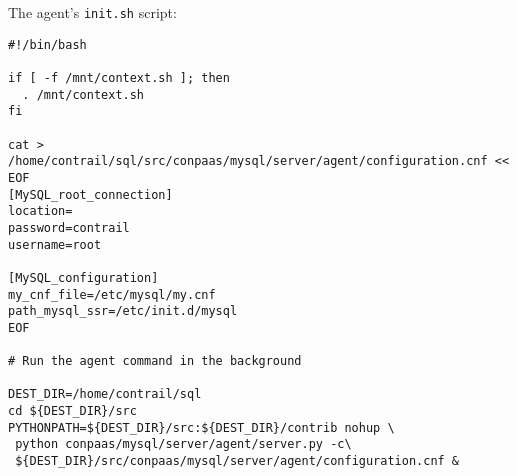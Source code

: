 \documentclass[a4paper,10pt]{article}
\begin{document}
\newpage
\vspace{4mm}

The agent's {\tt init.sh} script:

\begin{Verbatim}[frame=single]
#!/bin/bash
 
if [ -f /mnt/context.sh ]; then
  . /mnt/context.sh
fi
 
cat >  /home/contrail/sql/src/conpaas/mysql/server/agent/configuration.cnf << EOF
[MySQL_root_connection]
location=
password=contrail
username=root

[MySQL_configuration]
my_cnf_file=/etc/mysql/my.cnf
path_mysql_ssr=/etc/init.d/mysql
EOF

# Run the agent command in the background

DEST_DIR=/home/contrail/sql
cd ${DEST_DIR}/src
PYTHONPATH=${DEST_DIR}/src:${DEST_DIR}/contrib nohup \
 python conpaas/mysql/server/agent/server.py -c\
 ${DEST_DIR}/src/conpaas/mysql/server/agent/configuration.cnf &

\end{Verbatim}

\newpage
\vspace{4mm}

\begin{thebibliography}{99}

\end{thebibliography}
\end{document}
